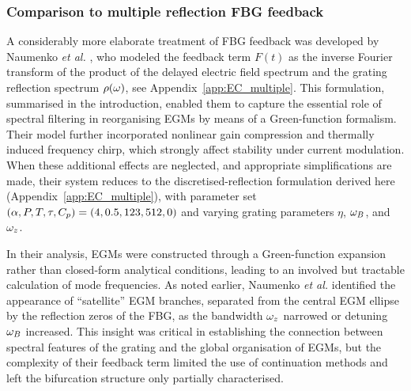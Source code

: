 \subsubsection{Comparison to multiple reflection FBG feedback}
\label{subsubsec:naumenko}
%
A considerably more elaborate treatment of FBG feedback was developed by Naumenko \textit{et al.} \cite{naumenko2003characteristics,naumenko2004slow}, who modeled the feedback term $F(t)$ as the inverse Fourier transform of the product of the delayed electric field spectrum and the grating reflection spectrum $\rho(\omega)$, see Appendix~\ref{app:EC_multiple}.
This formulation, summarised in the introduction, enabled them to capture the essential role of spectral filtering in reorganising EGMs by means of a Green-function formalism.
Their model further incorporated nonlinear gain compression and thermally induced frequency chirp, which strongly affect stability under current modulation.
When these additional effects are neglected, and appropriate simplifications are made, their system reduces to the discretised-reflection formulation derived here (Appendix~\ref{app:EC_multiple}), with parameter set $(\alpha, P, T, \tau, C_p) = (4, 0.5, 123, 512, 0)$ and varying grating parameters $\eta$, $\omega_B$, and $\omega_z$.
%
\par
%
In their analysis, EGMs were constructed through a Green-function expansion rather than closed-form analytical conditions, leading to an involved but tractable calculation of mode frequencies.
As noted earlier, Naumenko \textit{et al.} identified the appearance of “satellite” EGM branches, separated from the central EGM ellipse by the reflection zeros of the FBG, as the bandwidth $\omega_z$ narrowed or detuning $\omega_B$ increased.
This insight was critical in establishing the connection between spectral features of the grating and the global organisation of EGMs, but the complexity of their feedback term limited the use of continuation methods and left the bifurcation structure only partially characterised.
%
